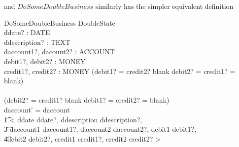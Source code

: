 \documentclass[11pt]{amsart}
\begin{document}
\indent and $DoSomeDoubleBusiness$ similarly has the simpler equivalent definition

\begin{schema}{DoSomeDoubleBusiness}
\Delta DoubleState\\
ddate? : DATE\\
ddescription? : TEXT\\
daccount1?, dacount2? : ACCOUNT\\ 
debit1?, debit2? : MONEY\\
credit1?, credit2? : MONEY
\where
(debit1? = credit2? \neq blank \land debit2? = credit1? = blank)\\
\lor\\
(debit2? = credit1? \neq blank \land debit1? = credit2? = blank)\\
daccount' = daccount \cat \\
\t1 < \lbind ddate \mapsto ddate?, ddescription \mapsto ddescription?, \\
\t3 daccount1 \mapsto daccount1?, daccount2 \mapsto daccount2?, debit1 \mapsto debit1?, \\
\t 4debit2 \mapsto debit2?, credit1 \mapsto credit1?, credit2 \mapsto credit2?  \rbind >\\
\end{schema}
\end{document}
